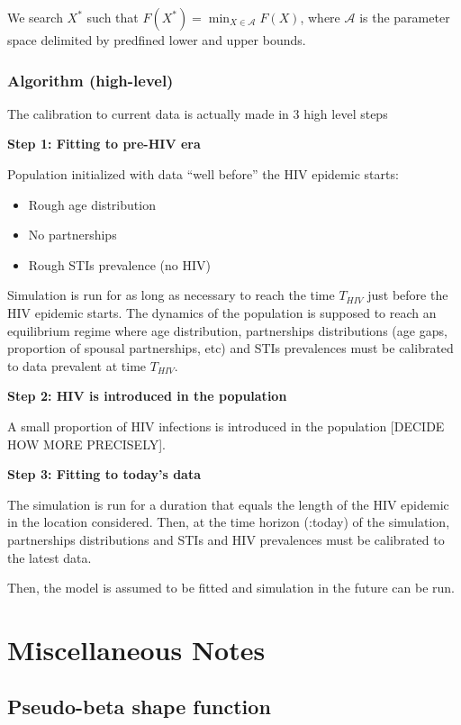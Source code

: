 \documentclass[11pt, onecolumn]{article}
\begin{document}
We search $X^*$ such that $F(X^*)=\min_{X\in \mathcal{A}} F(X)$, where $\mathcal{A}$ is the parameter space delimited by predfined lower and upper bounds.

\subsubsection{Algorithm (high-level)}
The calibration to current data is actually made in 3 high level steps

\textbf{Step 1: Fitting to pre-HIV era}

Population initialized with data ``well before'' the HIV epidemic starts:
\begin{itemize}
\item Rough age distribution
\item No partnerships
\item Rough STIs prevalence (no HIV)
\end{itemize}

Simulation is run for as long as necessary to reach the time $T_{HIV}$ just before the HIV epidemic starts. The dynamics of the population is supposed to reach an equilibrium regime where age distribution, partnerships distributions (age gaps, proportion of spousal partnerships, etc) and STIs prevalences must be calibrated to data prevalent at time  $T_{HIV}$.

\textbf{Step 2: HIV is introduced in the population}

A small proportion of HIV infections is introduced in the population [DECIDE HOW MORE PRECISELY].

\textbf{Step 3: Fitting to today's data}

The simulation is run for a duration that equals the length of the HIV epidemic in the location considered. Then, at the time horizon (:today) of the simulation, partnerships distributions and STIs and HIV prevalences must be calibrated to the latest data.

Then, the model is assumed to be fitted and simulation in the future can be run.








\section{Miscellaneous Notes}

\subsection{Pseudo-beta shape function} \label{sec:pseudobeta}
\end{document}
